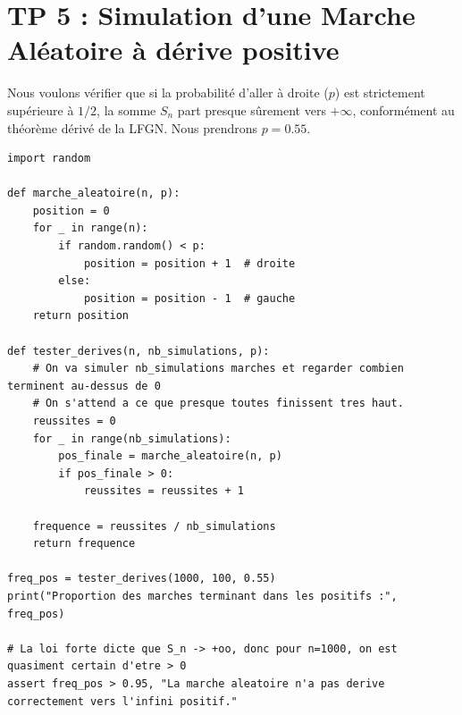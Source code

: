 \documentclass[11pt,a4paper]{article}
\begin{document}
\section*{TP 5 : Simulation d'une Marche Aléatoire à dérive positive}

Nous voulons vérifier que si la probabilité d'aller à droite ($p$) est strictement supérieure à $1/2$, la somme $S_n$ part presque sûrement vers $+\infty$, conformément au théorème dérivé de la LFGN.
Nous prendrons $p = 0.55$.

\begin{lstlisting}
import random

def marche_aleatoire(n, p):
    position = 0
    for _ in range(n):
        if random.random() < p:
            position = position + 1  # droite
        else:
            position = position - 1  # gauche
    return position

def tester_derives(n, nb_simulations, p):
    # On va simuler nb_simulations marches et regarder combien terminent au-dessus de 0
    # On s'attend a ce que presque toutes finissent tres haut.
    reussites = 0
    for _ in range(nb_simulations):
        pos_finale = marche_aleatoire(n, p)
        if pos_finale > 0:
            reussites = reussites + 1

    frequence = reussites / nb_simulations
    return frequence

freq_pos = tester_derives(1000, 100, 0.55)
print("Proportion des marches terminant dans les positifs :", freq_pos)

# La loi forte dicte que S_n -> +oo, donc pour n=1000, on est quasiment certain d'etre > 0
assert freq_pos > 0.95, "La marche aleatoire n'a pas derive correctement vers l'infini positif."
\end{lstlisting}
\end{document}
